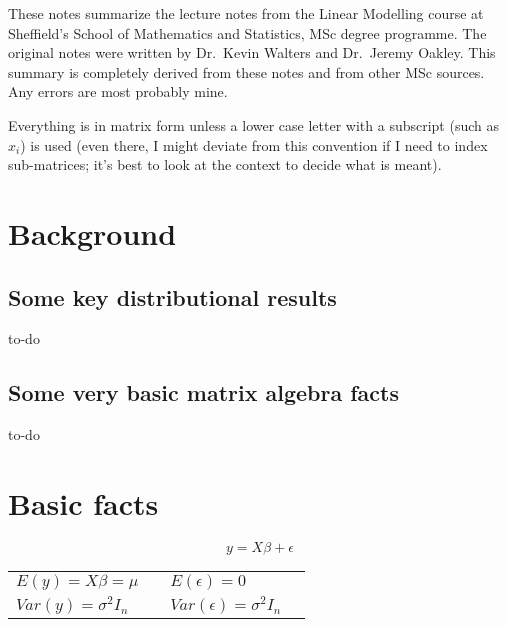 
These notes summarize the lecture notes from the Linear Modelling course at Sheffield's School of Mathematics and Statistics, MSc degree programme. The original notes were written by Dr.\ Kevin Walters and Dr.\ Jeremy Oakley. This summary is completely derived from these notes and from other MSc sources. Any errors are most probably mine.

Everything is in matrix form unless a lower case letter with a subscript (such as $x_i$) is used (even there, I might deviate from this convention if I need to index sub-matrices; it's best to look at the context to decide what is meant).


\section{Background}

\subsection{Some key distributional results}

to-do 

\subsection{Some very basic matrix algebra facts}

to-do 

\section{Basic facts}

\begin{equation}
y=X\beta+\epsilon
\end{equation}

\begin{tabular}{@{}ll@{}ll@{}}
$E(y) = X\beta = \mu$ &  & $E(\epsilon)=0$  \\
$Var(y) = \sigma^2 I_n $ & & $Var(\epsilon) = \sigma^2 I_n$ \\
\end{tabular}

